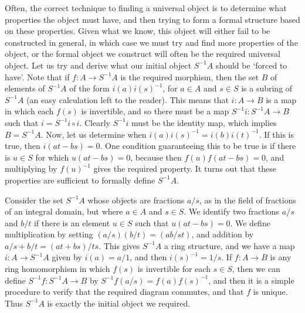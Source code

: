 Often, the correct technique to finding a universal object is to determine what properties the object must have, and then trying to form a formal structure based on these properties. Given what we know, this object will either fail to be constructed in general, in which case we must try and find more properties of the object, or the formal object we construct will often be the required universal object. Let us try and derive what our initial object $S^{-1}A$ should be `forced to have'. Note that if $f: A \to S^{-1}A$ is the required morphism, then the set $B$ of elements of $S^{-1}A$ of the form $i(a)i(s)^{-1}$, for $a \in A$ and $s \in S$ is a subring of $S^{-1}A$ (an easy calculation left to the reader). This means that $i: A \to B$ is a map in which each $f(s)$ is invertible, and so there must be a map $S^{-1}i: S^{-1}A \to B$ such that $i = S^{-1}i \circ i$. Clearly $S^{-1}i$ must be the identity map, which implies $B = S^{-1}A$. Now, let us determine when $i(a)i(s)^{-1} = i(b)i(t)^{-1}$. If this is true, then $i(at - bs) = 0$. One condition guaranteeing this to be true is if there is $u \in S$ for which $u(at - bs) = 0$, because then $f(u)f(at-bs) = 0$, and multiplying by $f(u)^{-1}$ gives the required property. It turns out that these properties are sufficient to formally define $S^{-1}A$.

Consider the set $S^{-1}A$ whose objects are fractions $a/s$, as in the field of fractions of an integral domain, but where $a \in A$ and $s \in S$. We identify two fractions $a/s$ and $b/t$ if there is an element $u \in S$ such that $u(at - bs) = 0$. We define multiplication by setting $(a/s)(b/t) = (ab/st)$, and addition by $a/s + b/t = (at + bs)/ts$. This gives $S^{-1}A$ a ring structure, and we have a map $i: A \to S^{-1}A$ given by $i(a) = a/1$, and then $i(s)^{-1} = 1/s$. If $f: A \to B$ is any ring homomorphism in which $f(s)$ is invertible for each $s \in S$, then we can define $S^{-1}f: S^{-1}A \to B$ by $S^{-1}f(a/s) = f(a)f(s)^{-1}$, and then it is a simple procedure to verify that the required diagram commutes, and that $f$ is unique. Thus $S^{-1}A$ is exactly the initial object we required.

